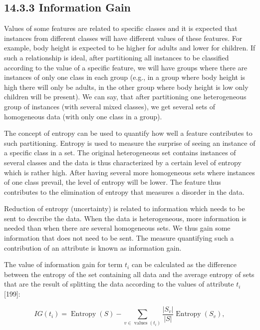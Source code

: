 \documentclass[10pt]{book}
\begin{document}
\subsection*{14.3.3 Information Gain}
Values of some features are related to specific classes and it is expected that instances from different classes will have different values of these features. For\\
example, body height is expected to be higher for adults and lower for children. If such a relationship is ideal, after partitioning all instances to be classified according to the value of a specific feature, we will have groups where there are instances of only one class in each group (e.g., in a group where body height is high there will only be adults, in the other group where body height is low only children will be present). We can say, that after partitioning one heterogeneous group of instances (with several mixed classes), we get several sets of homogeneous data (with only one class in a group).

The concept of entropy can be used to quantify how well a feature contributes to such partitioning. Entropy is used to measure the surprise of seeing an instance of a specific class in a set. The original heterogeneous set contains instances of several classes and the data is thus characterized by a certain level of entropy which is rather high. After having several more homogeneous sets where instances of one class prevail, the level of entropy will be lower. The feature thus contributes to the elimination of entropy that measures a disorder in the data.

Reduction of entropy (uncertainty) is related to information which needs to be sent to describe the data. When the data is heterogeneous, more information is needed than when there are several homogeneous sets. We thus gain some information that does not need to be sent. The measure quantifying such a contribution of an attribute is known as information gain.

The value of information gain for term $t_{i}$ can be calculated as the difference between the entropy of the set containing all data and the average entropy of sets that are the result of splitting the data according to the values of attribute $t_{i}$ [199]:


\begin{equation*}
I G\left(t_{i}\right)=\operatorname{Entropy}(S)-\sum_{v \in \text { values }\left(t_{i}\right)} \frac{\left|S_{v}\right|}{|S|} \operatorname{Entropy}\left(S_{v}\right), \tag{14.18}
\end{equation*}
\end{document}
